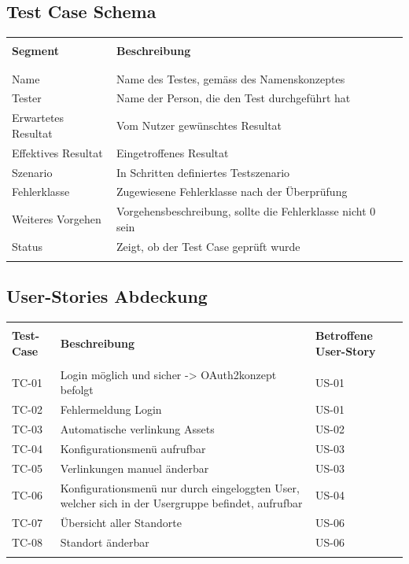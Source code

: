 \subsection{Test Case Schema}
\begin{table}[H]
  \begin{tabularx}{\textwidth}{l l X}\hline \\
  \textbf{Segment} & \textbf{Beschreibung} \\ \\\hline \\
  Name & Name des Testes, gemäss des Namenskonzeptes \\
  Tester & Name der Person, die den Test durchgeführt hat \\
  Erwartetes Resultat & Vom Nutzer gewünschtes Resultat \\
  Effektives Resultat & Eingetroffenes Resultat \\
  Szenario & In Schritten definiertes Testszenario \\
  Fehlerklasse & Zugewiesene Fehlerklasse nach der Überprüfung \\
  Weiteres Vorgehen & Vorgehensbeschreibung, sollte die Fehlerklasse nicht 0 sein \\
  Status & Zeigt, ob der Test Case geprüft wurde \\
  \\\hline
  \end{tabularx}
\end{table}
\subsection{User-Stories Abdeckung}
\begin{table}[H]
  \begin{tabularx}{\textwidth}{l X l}\hline \\
  \textbf{Test-Case} & \textbf{Beschreibung} & \textbf{Betroffene User-Story} \\\hline \\
  TC-01 & Login möglich und sicher -> OAuth2konzept befolgt & US-01 \\
  TC-02 & Fehlermeldung Login & US-01 \\
  TC-03 & Automatische verlinkung Assets & US-02 \\
  TC-04 & Konfigurationsmenü aufrufbar & US-03 \\
  TC-05 & Verlinkungen manuel änderbar & US-03 \\
  TC-06 & Konfigurationsmenü nur durch eingeloggten User, welcher sich in der Usergruppe befindet, aufrufbar & US-04 \\
  TC-07 & Übersicht aller Standorte & US-06 \\
  TC-08 & Standort änderbar & US-06 \\
  \\\hline
  \end{tabularx}
\end{table}
\pagebreak
